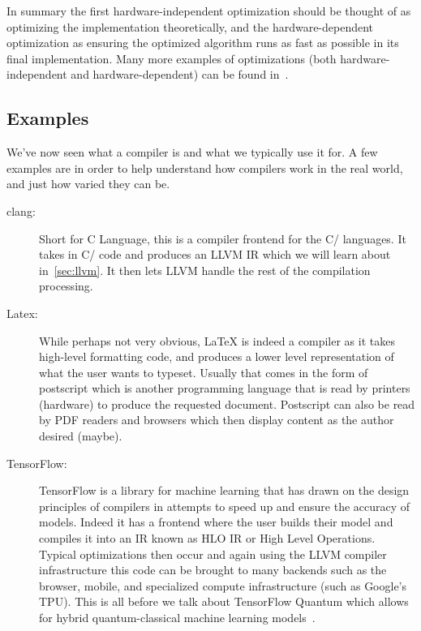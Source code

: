 In summary the first hardware-independent optimization should be thought of as optimizing the implementation theoretically, and the hardware-dependent optimization as ensuring the optimized algorithm runs as fast as possible in its final implementation.
Many more examples of optimizations (both hardware-independent and hardware-dependent) can be found in~\cite[Chapter~8]{compiler-optimizations}.

\subsection{Examples}\label{sec:compiler-examples}

We've now seen what a compiler is and what we typically use it for.
A few examples are in order to help understand how compilers work in the real world, and just how varied they can be.

\begin{description}
    \item[clang:] Short for C Language, this is a compiler frontend for the C/\CPP{} languages. It takes in C/\CPP{} code and produces an LLVM \ac{IR} which we will learn about in~\cref{sec:llvm}. It then lets LLVM handle the rest of the compilation processing.
    \item[Latex:] While perhaps not very obvious, \LaTeX{} is indeed a compiler as it takes high-level formatting code, and produces a lower level representation of what the user wants to typeset. Usually that comes in the form of postscript which is another programming language that is read by printers (hardware) to produce the requested document. Postscript can also be read by PDF readers and browsers which then display content as the author desired (maybe).
    \item[TensorFlow:] TensorFlow is a library for machine learning that has drawn on the design principles of compilers in attempts to speed up and ensure the accuracy of models. Indeed it has a frontend where the user builds their model and compiles it into an \ac{IR} known as HLO \ac{IR} or High Level Operations. Typical optimizations then occur and again using the LLVM compiler infrastructure this code can be brought to many backends such as the browser, mobile, and specialized compute infrastructure (such as Google's \ac{TPU}). This is all before we talk about TensorFlow Quantum which allows for hybrid quantum-classical machine learning models~\cite{tensoflowquantum}.
\end{description}

